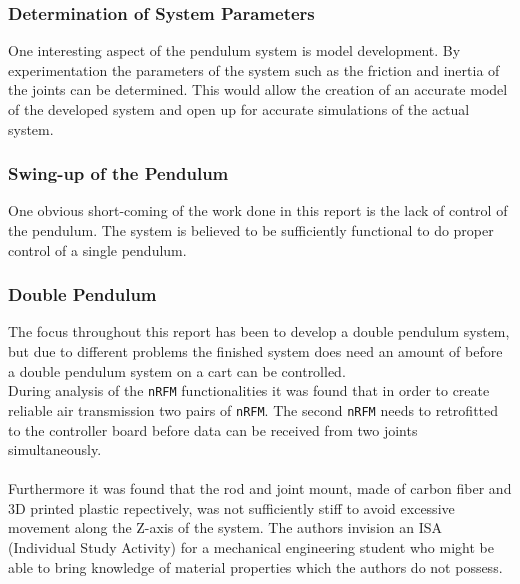 \subsubsection{Determination of System Parameters} %
\label{ssub:determination_of_system_parameters}
One interesting aspect of the pendulum system is model development.
By experimentation the parameters of the system such as the friction and inertia of the joints can be determined.
This would allow the creation of an accurate model of the developed system and open up for accurate simulations of the actual system.

\subsubsection{Swing-up of the Pendulum} %
\label{ssub:swing_up_of_the_pendulum}
One obvious short-coming of the work done in this report is the lack of control of the pendulum.
The system is believed to be sufficiently functional to do proper control of a single pendulum.

\subsubsection{Double Pendulum} %
\label{ssub:double_pendulum}
The focus throughout this report has been to develop a double pendulum system, but due to different problems the finished system does need an amount of before a double pendulum system on a cart can be controlled.
\\
During analysis of the \texttt{nRFM} functionalities it was found that in order to create reliable air transmission two pairs of \texttt{nRFM}.
The second \texttt{nRFM} needs to retrofitted to the controller board before data can be received from two joints simultaneously.
\\~\\
Furthermore it was found that the rod and joint mount, made of carbon fiber and 3D printed plastic repectively, was not sufficiently stiff to avoid excessive movement along the Z-axis of the system.
The authors invision an ISA (Individual Study Activity) for a mechanical engineering student who might be able to bring knowledge of material properties which the authors do not possess.

